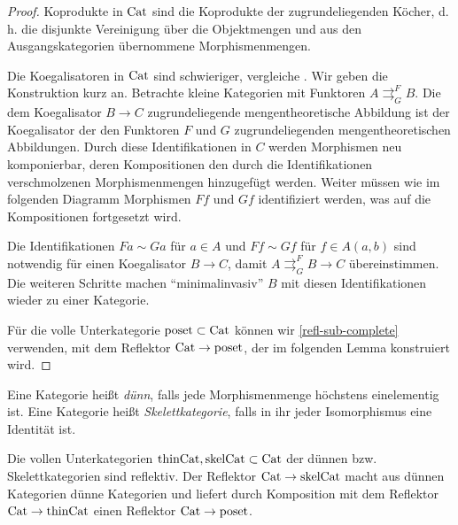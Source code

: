 \begin{proof}
  Koprodukte in $\operatorname{Cat}$ sind die Koprodukte der zugrundeliegenden
  Köcher, d. h. die disjunkte Vereinigung über die Objektmengen und
  aus den Ausgangskategorien übernommene Morphismenmengen.

  Die Koegalisatoren in $\operatorname{Cat}$ sind schwieriger, vergleiche
  \cite{BBP}. Wir geben die Konstruktion kurz an. Betrachte kleine
  Kategorien mit Funktoren $A
  \mathrel{\mathop{\rightrightarrows}^{F}_{G}} B$. Die dem
  Koegalisator $B \to C$ zugrundeliegende mengentheoretische Abbildung
  ist der Koegalisator der den Funktoren $F$ und $G$ zugrundeliegenden
  mengentheoretischen Abbildungen. Durch diese Identifikationen in $C$
  werden Morphismen neu komponierbar, deren Kompositionen den durch
  die Identifikationen verschmolzenen Morphismenmengen hinzugefügt
  werden. Weiter müssen wie im folgenden Diagramm Morphismen $Ff$ und
  $Gf$ identifiziert werden, was auf die Kompositionen fortgesetzt
  wird.

  
  Die Identifikationen $Fa \sim Ga$ für $a \in A$ und $Ff \sim Gf$ für
  $f \in A(a, b)$ sind notwendig für einen Koegalisator $B \to C$,
  damit $A \mathrel{\mathop{\rightrightarrows}^{F}_{G}} B \to C$
  übereinstimmen. Die weiteren Schritte machen ``minimalinvasiv'' $B$
  mit diesen Identifikationen wieder zu einer Kategorie.

  Für die volle Unterkategorie $\operatorname{poset} \subset \operatorname{Cat}$ können wir
  \ref{refl-sub-complete} verwenden, mit dem Reflektor $\operatorname{Cat} \to
  \operatorname{poset}$, der im folgenden Lemma konstruiert wird.

\end{proof}
\begin{defn}
  Eine Kategorie heißt \emph{dünn}, falls jede Morphismenmenge
  höchstens einelementig ist. Eine Kategorie heißt
  \emph{Skelettkategorie}, falls in ihr jeder Isomorphismus eine
  Identität ist.
\end{defn}
\begin{lemma} \label{poset-reflective}
  Die vollen Unterkategorien $\mathrm{thinCat}, \mathrm{skelCat}
  \subset \operatorname{Cat}$ der dünnen bzw. Skelettkategorien sind reflektiv. Der
  Reflektor $\operatorname{Cat} \to \mathrm{skelCat}$ macht aus dünnen Kategorien
  dünne Kategorien und liefert durch Komposition mit dem Reflektor
  $\operatorname{Cat} \to \mathrm{thinCat}$ einen Reflektor $\operatorname{Cat} \to \operatorname{poset}$.
\end{lemma}
